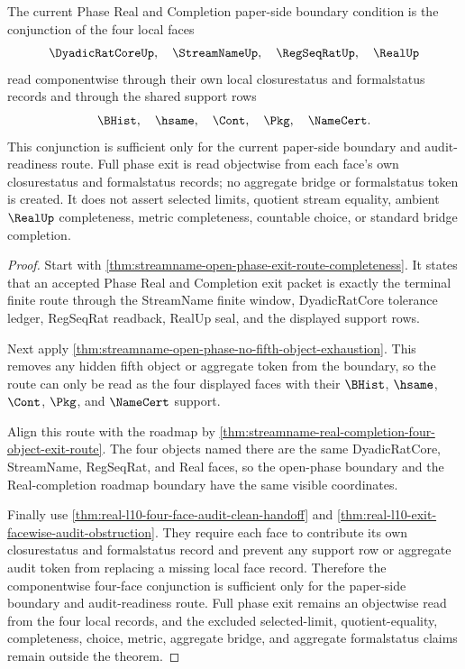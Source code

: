 \begin{theorem}
\label{thm:streamname-open-phase-roadmap-exit-conjunction}
The current Phase Real and Completion paper-side boundary condition is the conjunction of the four local faces
$$
\DyadicRatCoreUp,\quad \StreamNameUp,\quad \RegSeqRatUp,\quad \RealUp
$$
read componentwise through their own local closurestatus and formalstatus records and through the shared support rows
$$
\BHist,\quad \hsame,\quad \Cont,\quad \Pkg,\quad \NameCert.
$$
This conjunction is sufficient only for the current paper-side boundary and audit-readiness route. Full phase exit is read objectwise from each face's own closurestatus and formalstatus records; no aggregate bridge or formalstatus token is created. It does not assert selected limits, quotient stream equality, ambient $\RealUp$ completeness, metric completeness, countable choice, or standard bridge completion.
\end{theorem}
\begin{proof}
Start with \autoref{thm:streamname-open-phase-exit-route-completeness}. It states that an accepted Phase Real and Completion exit packet is exactly the terminal finite route through the StreamName finite window, DyadicRatCore tolerance ledger, RegSeqRat readback, RealUp seal, and the displayed support rows.

Next apply \autoref{thm:streamname-open-phase-no-fifth-object-exhaustion}. This removes any hidden fifth object or aggregate token from the boundary, so the route can only be read as the four displayed faces with their $\BHist$, $\hsame$, $\Cont$, $\Pkg$, and $\NameCert$ support.

Align this route with the roadmap by \autoref{thm:streamname-real-completion-four-object-exit-route}. The four objects named there are the same DyadicRatCore, StreamName, RegSeqRat, and Real faces, so the open-phase boundary and the Real-completion roadmap boundary have the same visible coordinates.

Finally use \autoref{thm:real-l10-four-face-audit-clean-handoff} and \autoref{thm:real-l10-exit-facewise-audit-obstruction}. They require each face to contribute its own closurestatus and formalstatus record and prevent any support row or aggregate audit token from replacing a missing local face record. Therefore the componentwise four-face conjunction is sufficient only for the paper-side boundary and audit-readiness route. Full phase exit remains an objectwise read from the four local records, and the excluded selected-limit, quotient-equality, completeness, choice, metric, aggregate bridge, and aggregate formalstatus claims remain outside the theorem.
\end{proof}

